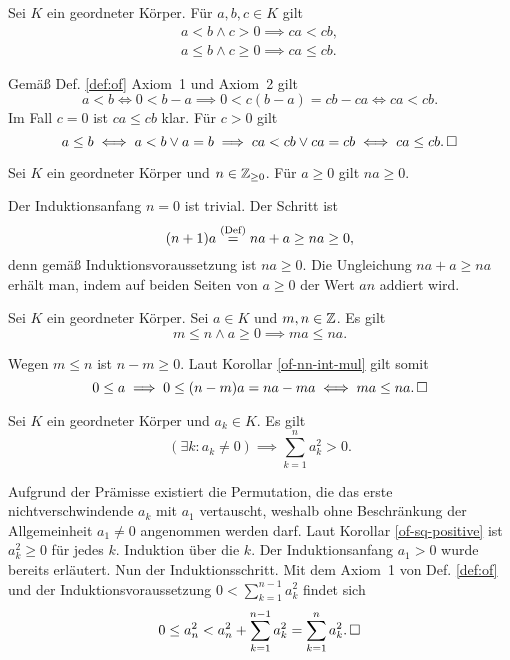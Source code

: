 \begin{Korollar}\label{of-ineq-mul}
Sei $K$ ein geordneter Körper. Für $a,b,c\in K$ gilt
\begin{gather*}
a<b\land c>0\implies ca<cb,\\
a\le b\land c\ge 0\implies ca\le cb.
\end{gather*}
\end{Korollar}
\begin{Beweis}
Gemäß Def. \ref{def:of} Axiom~1 und Axiom~2 gilt
\[a<b\iff 0<b-a \implies 0<c(b-a) = cb-ca\iff ca<cb.\]
Im Fall $c=0$ ist $ca\le cb$ klar. Für $c>0$ gilt
\[a\le b\iff a<b\lor a=b\implies ca<cb\lor ca=cb\iff ca\le cb.\,\square\]
\end{Beweis}

\begin{Korollar}\label{of-nn-int-mul}
Sei $K$ ein geordneter Körper und $n\in\mathbb Z_{\ge 0}$. Für $a\ge 0$ gilt
$na\ge 0$.
\end{Korollar}
\begin{Beweis} Der Induktionsanfang $n=0$ ist trivial. Der Schritt ist
\[(n+1)a \stackrel{\mathrm{(Def)}}{=} na+a \ge na \ge 0,\]
denn gemäß Induktionsvoraussetzung ist $na\ge 0$. Die Ungleichung
$na+a\ge na$ erhält man, indem auf beiden Seiten von
$a\ge 0$ der Wert $an$ addiert wird.\,\qedsymbol
\end{Beweis}

\begin{Korollar}
Sei $K$ ein geordneter Körper. Sei $a\in K$ und $m,n\in\mathbb Z$.
Es gilt
\[m\le n\land a\ge 0\implies ma\le na.\]
\end{Korollar}
\begin{Beweis}
Wegen $m\le n$ ist $n-m\ge 0$. Laut Korollar \ref{of-nn-int-mul}
gilt somit
\[0\le a \implies 0\le (n-m)a = na-ma\iff ma\le na.\,\square\]
\end{Beweis}

\begin{Korollar}\label{of-sum-of-sq-positive}
Sei $K$ ein geordneter Körper und $a_k\in K$. Es gilt
\[\textstyle (\exists k\colon a_k\ne 0)\implies \sum_{k=1}^n a_k^2 > 0.\]
\end{Korollar}
\begin{Beweis}
Aufgrund der Prämisse existiert die Permutation, die das
erste nichtverschwindende $a_k$ mit $a_1$ vertauscht, weshalb ohne
Beschränkung der Allgemeinheit $a_1\ne 0$ angenommen werden darf.
Laut Korollar \ref{of-sq-positive} ist $a_k^2\ge 0$ für jedes $k$.
Induktion über die $k$. Der Induktionsanfang $a_1>0$ wurde bereits
erläutert. Nun der Induktionsschritt. Mit dem Axiom~1 von Def. \ref{def:of}
und der Induktionsvoraussetzung $0 < \sum_{k=1}^{n-1} a_k^2$ findet sich
\[0\le a_n^2 < a_n^2 + \sum_{k=1}^{n-1} a_k^2 = \sum_{k=1}^n a_k^2.\,\square\]
\end{Beweis}

